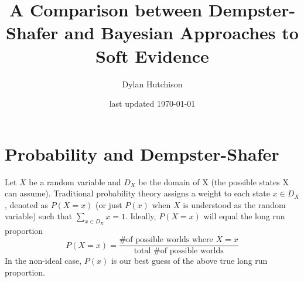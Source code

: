 \documentclass[letterpaper]{article}
\begin{document}
\thispagestyle{empty}
\pagestyle{empty} %

\author{Dylan Hutchison}
\title{A Comparison between Dempster-Shafer and Bayesian Approaches to Soft Evidence}
\date{last updated \today}
\maketitle


\section{Probability and Dempster-Shafer}
Let $X$ be a random variable and $D_X$ be the domain of X (the possible states X can assume).  Traditional probability theory assigns a weight to each state $x \in D_X$, denoted as $P(X=x)$ (or just $P(x)$ when $X$ is understood as the random variable) such that $\sum_{x \in D_X}x = 1$. Ideally, $P(X=x)$ will equal the long run proportion 
\[P(X=x) = \dfrac{\text{\# of possible worlds where } X=x}{\text{total \# of possible worlds}}\]
In the non-ideal case, $P(x)$ is our best guess of the above true long run proportion.
\end{document}
